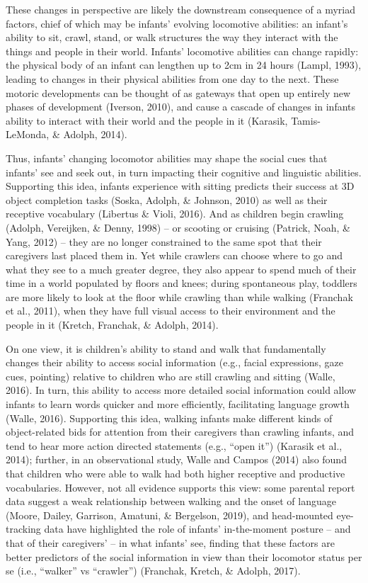 \documentclass[english,man]{apa6}
\begin{document}
These changes in perspective are likely the downstream consequence of a
myriad factors, chief of which may be infants' evolving locomotive
abilities: an infant's ability to sit, crawl, stand, or walk structures
the way they interact with the things and people in their world.
Infants' locomotive abilities can change rapidly: the physical body of
an infant can lengthen up to 2cm in 24 hours (Lampl, 1993), leading to
changes in their physical abilities from one day to the next. These
motoric developments can be thought of as gateways that open up entirely
new phases of development (Iverson, 2010), and cause a cascade of
changes in infants ability to interact with their world and the people
in it (Karasik, Tamis-LeMonda, \& Adolph, 2014).

Thus, infants' changing locomotor abilities may shape the social cues
that infants' see and seek out, in turn impacting their cognitive and
linguistic abilities. Supporting this idea, infants experience with
sitting predicts their success at 3D object completion tasks (Soska,
Adolph, \& Johnson, 2010) as well as their receptive vocabulary
(Libertus \& Violi, 2016). And as children begin crawling (Adolph,
Vereijken, \& Denny, 1998) -- or scooting or cruising (Patrick, Noah, \&
Yang, 2012) -- they are no longer constrained to the same spot that
their caregivers last placed them in. Yet while crawlers can choose
where to go and what they see to a much greater degree, they also appear
to spend much of their time in a world populated by floors and knees;
during spontaneous play, toddlers are more likely to look at the floor
while crawling than while walking (Franchak et al., 2011), when they
have full visual access to their environment and the people in it
(Kretch, Franchak, \& Adolph, 2014).

On one view, it is children's ability to stand and walk that
fundamentally changes their ability to access social information (e.g.,
facial expressions, gaze cues, pointing) relative to children who are
still crawling and sitting (Walle, 2016). In turn, this ability to
access more detailed social information could allow infants to learn
words quicker and more efficiently, facilitating language growth (Walle,
2016). Supporting this idea, walking infants make different kinds of
object-related bids for attention from their caregivers than crawling
infants, and tend to hear more action directed statements (e.g.,
\enquote{open it}) (Karasik et al., 2014); further, in an observational
study, Walle and Campos (2014) also found that children who were able to
walk had both higher receptive and productive vocabularies. However, not
all evidence supports this view: some parental report data suggest a
weak relationship between walking and the onset of language (Moore,
Dailey, Garrison, Amatuni, \& Bergelson, 2019), and head-mounted
eye-tracking data have highlighted the role of infants' in-the-moment
posture -- and that of their caregivers' -- in what infants' see,
finding that these factors are better predictors of the social
information in view than their locomotor status per se (i.e.,
\enquote{walker} vs \enquote{crawler}) (Franchak, Kretch, \& Adolph,
2017).
\end{document}
